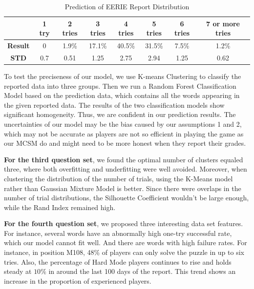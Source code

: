 \documentclass[12pt]{article}
\begin{document}
\begin{table}[h]
    \centering
    \begin{tabular}{|c|c|c|c|c|c|c|c|}
    \hline
    \textbf{}       & \textbf{1 try} & \textbf{2 tries} & \textbf{3 tries} & \textbf{4 tries} & \textbf{5 tries} & \textbf{6 tries} & \textbf{7 or more tries} \\ \hline
    \textbf{Result} & 0              & 1.9\%            & 17.1\%           & 40.5\%           & 31.5\%           & 7.5\%            & 1.2\%                    \\ \hline
    \textbf{STD}    & 0.7            & 0.51             & 1.25             & 2.75             & 2.94             & 1.25             & 0.62                     \\ \hline
    \end{tabular}
    \caption{Prediction of EERIE Report Distribution}
    \label{letterTable}
\end{table}

\vspace{0.1cm}
\noindent
To test the preciseness of our model, we use K-means Clustering to classify the reported data into three groups. Then we run a Random Forest Classification Model based on the prediction data, which contains all the words appearing in the given reported data. The results of the two classification models show significant homogeneity. Thus, we are confident in our prediction results. The uncertainties of our model may be the bias caused by our assumptions 1 and 2, which may not be accurate as players are not so efficient in playing the game as our MCSM do and might need to be more honest when they report their grades.

\vspace{0.1cm}
\noindent
\textbf{For the third question set}, we found the optimal number of clusters equaled three, where both overfitting and underfitting were well avoided. Moreover, when clustering the distribution of the number of trials, using the K-Means model rather than Gaussian Mixture Model is better. Since there were overlaps in the number of trial distributions, the Silhouette Coefficient wouldn’t be large enough, while the Rand Index remained high.

\vspace{0.1cm}
\noindent
\textbf{For the fourth question set}, we proposed three interesting data set features. For instance, several words have an abnormally high one-try successful rate, which our model cannot fit well. And there are words with high failure rates. For instance, in position M108, 48\% of players can only solve the puzzle in up to six tries. Also, the percentage of Hard Mode players continues to rise and holds steady at $10\%$ in around the last 100 days of the report. This trend shows an increase in the proportion of experienced players.
\end{document}

